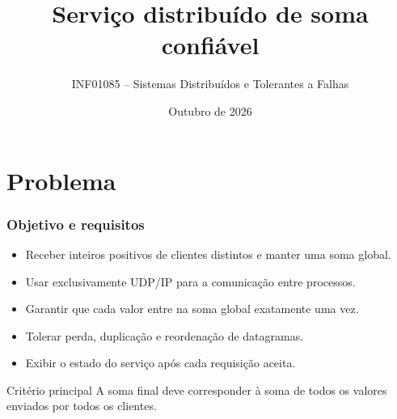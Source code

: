 \documentclass{beamer}
\title[Serviço distribuído de soma]{Serviço distribuído de soma confiável}
\subtitle{INF01085 -- Sistemas Distribuídos e Tolerantes a Falhas}
\author{\Integrantes}
\institute{Instituto de Informática -- UFRGS}
\date{Outubro de 2026}
\begin{document}
\InfTitlePage

\section{Problema}

\begin{frame}
  \frametitle{Objetivo e requisitos}
  \begin{itemize}
    \item Receber inteiros positivos de clientes distintos e manter uma soma global.
    \item Usar exclusivamente UDP/IP para a comunicação entre processos.
    \item Garantir que cada valor entre na soma global exatamente uma vez.
    \item Tolerar perda, duplicação e reordenação de datagramas.
    \item Exibir o estado do serviço após cada requisição aceita.
  \end{itemize}

  \vspace{1em}
  \begin{block}{Critério principal}
    A soma final deve corresponder à soma de todos os valores enviados por todos os clientes.
  \end{block}
\end{frame}
\end{document}
